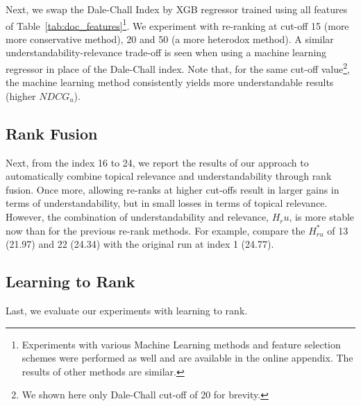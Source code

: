 Next, we swap the Dale-Chall Index by XGB regressor trained using all features of Table~\ref{tab:doc_features}\footnote{Experiments with various Machine Learning methods and feature selection schemes were performed as well and are available in the online appendix. The results of other methods are similar.}. %
We experiment with re-ranking at cut-off 15 (more more conservative method), 20 and 50 (a more heterodox method). 
A similar understandability-relevance trade-off is seen when using a machine learning regressor in place of the Dale-Chall index.
Note that, for the same cut-off value\footnote{We shown here only Dale-Chall cut-off of 20 for brevity.}, the machine learning method consistently yields more understandable results (higher $NDCG_u$). 

\subsection{Rank Fusion}
\label{results:fusion}

Next, from the index 16 to 24, we report the results of our approach to automatically combine topical relevance and understandability through rank fusion.
Once more, allowing re-ranks at higher cut-offs result in larger gains in terms of understandability, but in small losses in terms of topical relevance.
However, the combination of understandability and relevance, $H_ru$, is more stable now than for the previous re-rank methods. 
For example, compare the $H_{ru}^*$ of 13 (21.97) and 22 (24.34) with the original run at index 1 (24.77).

\subsection{Learning to Rank}
\label{results:ltr}

Last, we evaluate our experiments with learning to rank. 



